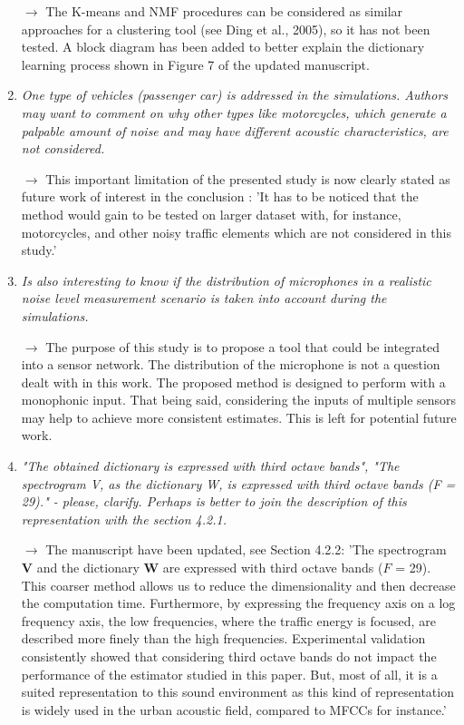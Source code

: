 \documentclass[10pt]{article}
\begin{document}
\begin{enumerate}
$\rightarrow$ The K-means and NMF procedures can be considered as similar approaches for a clustering tool (see Ding et al., 2005), so it has not been tested.
A block diagram has been added to better explain the dictionary learning process shown in Figure 7 of the updated manuscript.


\item \emph{One type of vehicles (passenger car) is addressed in the simulations. Authors may want to comment on why other types like motorcycles, which generate a palpable amount of noise and may have different acoustic characteristics, are not considered.}

$\rightarrow$ This important limitation of the presented study is now clearly stated as future work of interest in the conclusion : 'It has to be noticed that the method would gain to be tested on larger dataset with, for instance, motorcycles, and other noisy traffic elements which are not considered in this study.'

\item \emph{Is also interesting to know if the distribution of microphones in a realistic noise level measurement scenario is taken into account during the simulations.}

$\rightarrow$ The purpose of this study is to propose a tool that could be integrated into a sensor network. The distribution of the microphone is not a question dealt with in this work. The proposed method is designed to perform with a monophonic input. That being said, considering the inputs of multiple sensors may help to achieve more consistent estimates. This is left for potential future work.

\item \emph{"The obtained dictionary is expressed with third octave bands", "The spectrogram V, as the dictionary W, is expressed with third octave bands (F = 29)." - please, clarify. Perhaps is better to join the description of this representation with the section 4.2.1.}

$\rightarrow$ The manuscript have been updated, see Section 4.2.2: 'The spectrogram $\mathbf{V}$ and the dictionary $\mathbf{W}$ are expressed with third octave bands ($F$ = 29). This coarser method allows us to reduce the dimensionality and then decrease the computation time. Furthermore, by expressing the frequency axis on a log frequency axis, the low frequencies, where the traffic energy is focused, are described more finely than the high frequencies. Experimental validation consistently showed that considering third octave bands do not impact the performance of the estimator studied in this paper. But, most of all, it is a suited representation to this sound environment as this kind of representation is widely used in the urban acoustic field, compared to MFCCs for instance.'


\end{enumerate}
\end{document}
